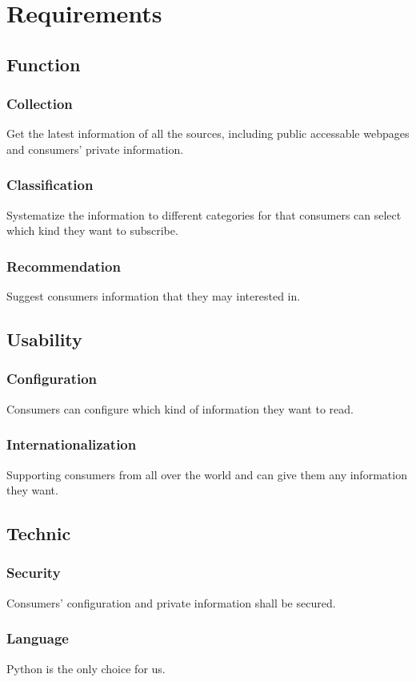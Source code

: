 \section{Requirements}
  \subsection{Function}
    \subsubsection{Collection}
      Get the latest information of all the sources, including public accessable webpages and consumers' private information.
    \subsubsection{Classification}
      Systematize the information to different categories for that consumers can select which kind they want to subscribe.
    \subsubsection{Recommendation}
      Suggest consumers information that they may interested in.
  \subsection{Usability}
    \subsubsection{Configuration}
      Consumers can configure which kind of information they want to read.
    \subsubsection{Internationalization}
      Supporting consumers from all over the world and can give them any information they want.
  \subsection{Technic}
    \subsubsection{Security}
      Consumers' configuration and private information shall be secured.
    \subsubsection{Language}
      Python is the only choice for us.
